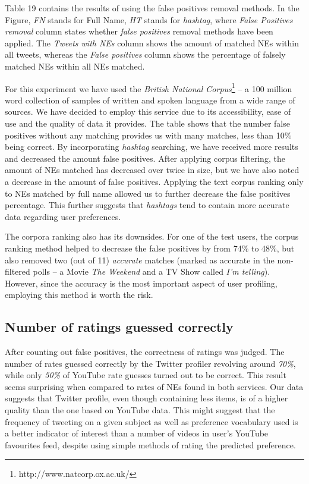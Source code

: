 Table 19 contains the results of using the false positives removal methods. In the Figure,
\textit{FN} stands for Full Name, \textit{HT} stands for \textit{hashtag}, where \textit{False Positives removal}
column states whether \textit{false positives} removal methods have been applied.
The \textit{Tweets with NEs} column shows the amount of matched NEs within all tweets, whereas
the \textit{False positives} column shows the percentage of falsely matched
NEs within all NEs matched.

For this experiment we have used the \textit{British National Corpus}\footnote{http://www.natcorp.ox.ac.uk/} --
a 100 million word collection of samples of written and spoken language from a wide range of sources. We have
decided to employ this service due to its accessibility, ease of use and the quality of data it provides.
The table shows that the number false positives without any matching provides us with many matches, less than
10\% being correct. By incorporating \textit{hashtag} searching, we have received more results and decreased the amount
false positives. After applying corpus filtering, the amount of NEs matched has decreased over twice in size,
but we have also noted a decrease in the amount of false positives. Applying the text corpus ranking only to
NEs matched by full name allowed us to further decrease the false positives percentage.
This further suggests that \textit{hashtags} tend to contain more accurate data regarding user preferences.

The corpora ranking also has its downsides. For one of the test users, the corpus ranking method helped to
decrease the false positives by from 74\% to 48\%, but also removed two (out of 11) \textit{accurate} matches (marked as
accurate in the non-filtered polls -- a Movie \textit{The Weekend} and a TV Show called \textit{I'm telling}).
However, since the accuracy is the most important aspect of user profiling, employing this method is worth
the risk.

\subsection{Number of ratings guessed correctly}
After counting out false positives, the correctness of ratings was judged. The
number of rates guessed correctly by the Twitter profiler revolving around \textit{70\%},
while only \textit{50\%} of YouTube rate guesses turned out to be correct. This
result seems surprising when compared to rates of NEs found in both
services. Our data suggests that Twitter profile, even though containing less
items, is of a higher quality than the one based on YouTube data.  This
might suggest that the frequency of tweeting on a given subject as well as
preference vocabulary used is a better indicator of interest than a number of
videos in user's YouTube favourites feed, despite using simple methods of rating
the predicted preference.
